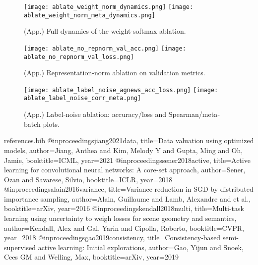 \documentclass{article}
\begin{document}
\begin{figure}[h]
  \centering
  \texttt{[image: ablate\_weight\_norm\_dynamics.png]}
  \texttt{[image: ablate\_weight\_norm\_meta\_dynamics.png]}
  \caption{(App.) Full dynamics of the weight‐softmax ablation.}
  \label{fig:ablation-softmax-detailed}
\end{figure}

\begin{figure}[h]
  \centering
  \texttt{[image: ablate\_no\_repnorm\_val\_acc.png]}
  \texttt{[image: ablate\_no\_repnorm\_val\_loss.png]}
  \caption{(App.) Representation‐norm ablation on validation metrics.}
  \label{fig:ablation-repnorm}
\end{figure}

\begin{figure}[h]
  \centering
  \texttt{[image: ablate\_label\_noise\_agnews\_acc\_loss.png]}
  \texttt{[image: ablate\_label\_noise\_corr\_meta.png]}
  \caption{(App.) Label‐noise ablation: accuracy/loss and Spearman/meta‐batch plots.}
  \label{fig:ablation-labelnoise}
\end{figure}

\begin{filecontents}{references.bib}
@inproceedings{jiang2021data,
  title={Data valuation using optimized models},
  author={Jiang, Anthea and Kim, Melody Y and Gupta, Ming and Oh, Jamie},
  booktitle={ICML},
  year={2021}
}
@inproceedings{sener2018active,
  title={Active learning for convolutional neural networks: A core‐set approach},
  author={Sener, Ozan and Savarese, Silvio},
  booktitle={ICLR},
  year={2018}
}
@inproceedings{alain2016variance,
  title={Variance reduction in SGD by distributed importance sampling},
  author={Alain, Guillaume and Lamb, Alexandre and et al.},
  booktitle={arXiv},
  year={2016}
}
@inproceedings{kendall2018multi,
  title={Multi‐task learning using uncertainty to weigh losses for scene geometry and semantics},
  author={Kendall, Alex and Gal, Yarin and Cipolla, Roberto},
  booktitle={CVPR},
  year={2018}
}
@inproceedings{gao2019consistency,
  title={Consistency‐based semi‐supervised active learning: Initial explorations},
  author={Gao, Yijun and Snoek, Cees GM and Welling, Max},
  booktitle={arXiv},
  year={2019}
}
\end{filecontents}
\end{document}

